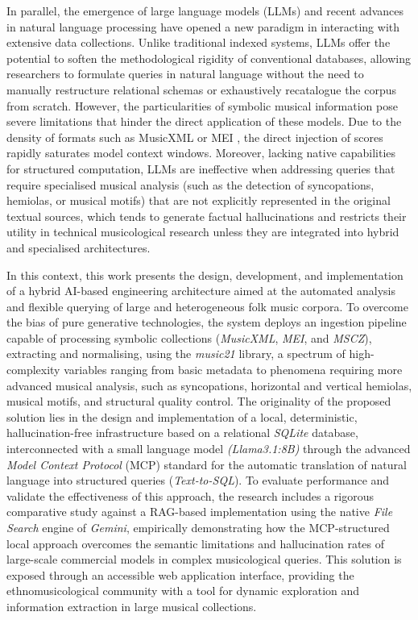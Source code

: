 In parallel, the emergence of large language models (LLMs) and recent advances in natural language processing have opened a new paradigm in interacting with extensive data collections. Unlike traditional indexed systems, LLMs offer the potential to soften the methodological rigidity of conventional databases, allowing researchers to formulate queries in natural language without the need to manually restructure relational schemas or exhaustively recatalogue the corpus from scratch. However, the particularities of symbolic musical information pose severe limitations that hinder the direct application of these models. Due to the density of formats such as MusicXML \citep{good2001musicxml} or MEI \citep{roland2002music}, the direct injection of scores rapidly saturates model context windows. Moreover, lacking native capabilities for structured computation, LLMs are ineffective when addressing queries that require specialised musical analysis (such as the detection of syncopations, hemiolas, or musical motifs) that are not explicitly represented in the original textual sources, which tends to generate factual hallucinations and restricts their utility in technical musicological research unless they are integrated into hybrid and specialised architectures.

In this context, this work presents the design, development, and implementation of a hybrid AI-based engineering architecture aimed at the automated analysis and flexible querying of large and heterogeneous folk music corpora. To overcome the bias of pure generative technologies, the system deploys an ingestion pipeline capable of processing symbolic collections (\textit{MusicXML}, \textit{MEI}, and \textit{MSCZ}), extracting and normalising, using the \textit{music21} library, a spectrum of high-complexity variables ranging from basic metadata to phenomena requiring more advanced musical analysis, such as syncopations, horizontal and vertical hemiolas, musical motifs, and structural quality control. The originality of the proposed solution lies in the design and implementation of a local, deterministic, hallucination-free infrastructure based on a relational \textit{SQLite} database, interconnected with a small language model \textit{(Llama3.1:8B)} through the advanced \textit{Model Context Protocol} (MCP) standard \citep{anthropic2024mcp} for the automatic translation of natural language into structured queries (\textit{Text-to-SQL}). To evaluate performance and validate the effectiveness of this approach, the research includes a rigorous comparative study against a RAG-based implementation using the native \textit{File Search} engine of \textit{Gemini}, empirically demonstrating how the MCP-structured local approach overcomes the semantic limitations and hallucination rates of large-scale commercial models in complex musicological queries. This solution is exposed through an accessible web application interface, providing the ethnomusicological community with a tool for dynamic exploration and information extraction in large musical collections.

